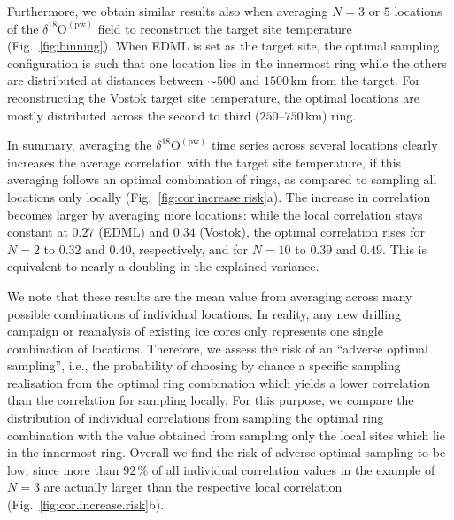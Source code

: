 \documentclass[cp, manuscript]{copernicus}
\begin{document}
Furthermore, we obtain similar results also when averaging $N=3$ or $5$
locations of the $\delta^{18}\mathrm{O}^{\mathrm{(pw)}}$ field to reconstruct
the target site temperature (Fig.~\ref{fig:binning}). When EDML is set as the
target site, the optimal sampling configuration is such that one location lies
in the innermost ring while the others are distributed at distances between
$\sim500$ and $1500$\,km from the target. For reconstructing the Vostok target
site temperature, the optimal locations are mostly distributed across the second
to third ($250$--$750$\,km) ring.

In summary, averaging the $\delta^{18}\mathrm{O}^{\mathrm{(pw)}}$ time series
across several locations clearly increases the average correlation with the
target site temperature, if this averaging follows an optimal combination of
rings, as compared to sampling all locations only locally
(Fig.~\ref{fig:cor.increase.risk}a). The increase in correlation becomes larger
by averaging more locations: while the local correlation stays constant at
$0.27$ (EDML) and $0.34$ (Vostok), the optimal correlation rises for $N=2$ to
$0.32$ and $0.40$, respectively, and for $N=10$ to $0.39$ and $0.49$. This is
equivalent to nearly a doubling in the explained variance.

We note that these results are the mean value from averaging across many
possible combinations of individual locations. In reality, any new drilling
campaign or reanalysis of existing ice cores only represents one single
combination of locations. Therefore, we assess the risk of an ``adverse optimal
sampling'', i.e., the probability of choosing by chance a specific sampling
realisation from the optimal ring combination which yields a lower correlation
than the correlation for sampling locally. For this purpose, we compare the
distribution of individual correlations from sampling the optimal ring
combination with the value obtained from sampling only the local sites which lie
in the innermost ring. Overall we find the risk of adverse optimal sampling to
be low, since more than $92\,\%$ of all individual correlation values in the
example of $N=3$ are actually larger than the respective local correlation
(Fig.~\ref{fig:cor.increase.risk}b).
\end{document}
